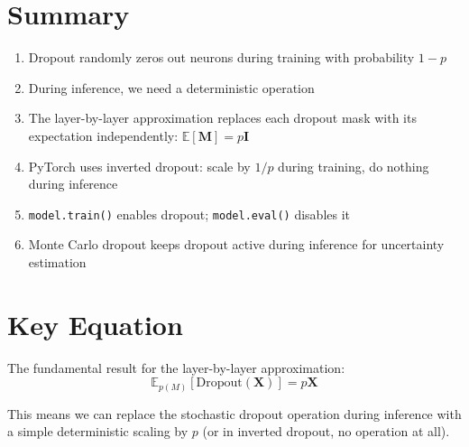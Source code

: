 \begin{notechapter}
\section{Summary}

\begin{enumerate}
    \item Dropout randomly zeros out neurons during training with probability $1-p$
    \item During inference, we need a deterministic operation
    \item The layer-by-layer approximation replaces each dropout mask with its expectation independently: $\mathbb{E}[\mathbf{M}] = p\mathbf{I}$
    \item PyTorch uses inverted dropout: scale by $1/p$ during training, do nothing during inference
    \item \texttt{model.train()} enables dropout; \texttt{model.eval()} disables it
    \item Monte Carlo dropout keeps dropout active during inference for uncertainty estimation
\end{enumerate}

\section*{Key Equation}

The fundamental result for the layer-by-layer approximation:
\begin{equation}
\boxed{\mathbb{E}_{p(M)}[\text{Dropout}(\mathbf{X})] = p\mathbf{X}}
\end{equation}

This means we can replace the stochastic dropout operation during inference with a simple deterministic scaling by $p$ (or in inverted dropout, no operation at all).
\end{notechapter}
